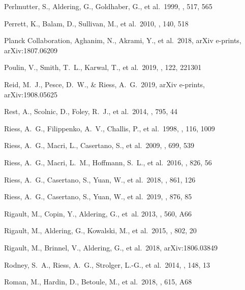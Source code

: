 \documentclass[]{aa} %
\begin{document}
\begin{thebibliography}{}
 Perlmutter, S., Aldering, G., Goldhaber, G., et al.\ 1999, \apj, 517, 565

 Perrett, K., Balam, D., Sullivan, M., et al.\ 2010, \aj, 140, 518



 Planck Collaboration, Aghanim, N., Akrami, Y., et al.\ 2018, arXiv e-prints, arXiv:1807.06209

 Poulin, V., Smith, T.~L., Karwal, T., et al.\ 2019, \prl, 122, 221301

 Reid, M.~J., Pesce, D.~W., \& Riess, A.~G.\ 2019, arXiv e-prints, arXiv:1908.05625

 Rest, A., Scolnic, D., Foley, R.~J., et al.\ 2014, \apj, 795, 44

 Riess, A.~G., Filippenko, A.~V., Challis, P., et al.\ 1998, \aj, 116, 1009

 Riess, A.~G., Macri, L., Casertano, S., et al.\ 2009, \apj, 699, 539

 Riess, A.~G., Macri, L.~M., Hoffmann, S.~L., et al.\ 2016, \apj, 826, 56

 Riess, A.~G., Casertano, S., Yuan, W., et al.\ 2018, \apj, 861, 126

 Riess, A.~G., Casertano, S., Yuan, W., et al.\ 2019, \apj, 876, 85

Rigault, M., Copin, Y., Aldering, G., {et~al.} 2013, \aap, 560, A66

 Rigault, M., Aldering, G., Kowalski, M., et al.\ 2015, \apj, 802, 20

 Rigault, M.,
  Brinnel, V., Aldering, G., et al.\ 2018, arXiv:1806.03849

 Rodney, S.~A.,
  Riess, A.~G., Strolger, L.-G., et al.\ 2014, \aj, 148, 13 
  
 Roman, M., Hardin, D., Betoule, M., et al.\ 2018, \aap, 615, A68


\end{thebibliography}
\end{document}
